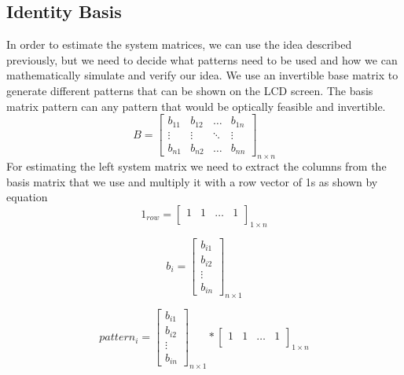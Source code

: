 \subsection{Identity Basis}
In order to estimate the system matrices, we can use the idea described previously, but we need to decide what patterns need to be used and how we can mathematically simulate and verify our idea. We use an invertible base matrix to generate different patterns that can be shown on the LCD screen. The basis matrix pattern can any pattern that would be optically feasible and invertible.
\begin{equation}
B = \begin{bmatrix} 
    b_{11} & b_{12} & \dots & b_{1n}\\
    \vdots & \vdots & \ddots &\vdots \\
    b_{n1} &  b_{n2} & \dots   & b_{nn} 
    \end{bmatrix}_{n\times n}
    \label{eq:basis_matr}
\end{equation}
For estimating the left system matrix we need to extract the columns from the basis matrix that we use and multiply it with a row vector of 1s as shown by equation \label{eq:pattern}
\begin{equation}
1_{row} = \begin{bmatrix} 
    1 & 1 & \dots &1\\

    \end{bmatrix}_{1\times n}
    \label{eq:one_row}
\end{equation}

\begin{equation}
b_{i} = \begin{bmatrix} 
    b_{i1} \\
    b_{i2} \\
    \vdots\\
    b_{in}
    \end{bmatrix}_{n\times 1}
    \label{eq:one_row}
\end{equation}


\begin{equation}
pattern_{i} = \begin{bmatrix} 
    b_{i1} \\
    b_{i2} \\
    \vdots\\
    b_{in}
    \end{bmatrix}_{n\times 1} *
    \begin{bmatrix} 
    1 & 1 & \dots &1\\

    \end{bmatrix}_{1\times n}
  \label{eq:pattern}
\end{equation}

